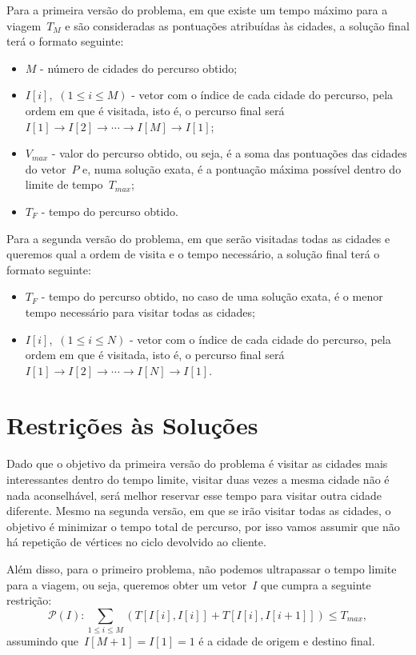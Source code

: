 \documentclass[12pt,a4paper,reqno]{report}
\numberwithin{figure}{section}
\numberwithin{equation}{section}
\numberwithin{figure}{section}
\numberwithin{equation}{section}
\begin{document}
Para a primeira versão do problema, em que existe um tempo máximo para a viagem~$T_M$ e são consideradas as pontuações atribuídas às cidades, a solução final terá o formato seguinte:
\begin{itemize}
	\item $M$ - número de cidades do percurso obtido;
	\item $I[i]$,~$(1 \leq i \leq M)$ - vetor com o índice de cada cidade do percurso, pela ordem em que é visitada, isto é, o percurso final será~$I[1] \rightarrow I[2] \rightarrow \cdots \rightarrow I[M] \rightarrow I[1]$;
	\item $V_{max}$ - valor do percurso obtido, ou seja, é a soma das pontuações das cidades do vetor~$P$ e, numa solução exata, é a pontuação máxima possível dentro do limite de tempo~$T_{max}$;
	\item $T_F$ - tempo do percurso obtido.
\end{itemize}

Para a segunda versão do problema, em que serão visitadas todas as cidades e queremos qual a ordem de visita e o tempo necessário, a solução final terá o formato seguinte:
\begin{itemize}
	\item $T_F$ - tempo do percurso obtido, no caso de uma solução exata, é o menor tempo necessário para visitar todas as cidades;
	\item $I[i]$,~$(1 \leq i \leq N)$ - vetor com o índice de cada cidade do percurso, pela ordem em que é visitada, isto é, o percurso final será~$I[1] \rightarrow I[2] \rightarrow \cdots \rightarrow I[N] \rightarrow I[1]$.
\end{itemize}

\section{Restrições às Soluções}

Dado que o objetivo da primeira versão do problema é visitar as cidades mais interessantes dentro do tempo limite, visitar duas vezes a mesma cidade não é nada aconselhável, será melhor reservar esse tempo para visitar outra cidade diferente. Mesmo na segunda versão, em que se irão visitar todas as cidades, o objetivo é minimizar o tempo total de percurso, por isso vamos assumir que não há repetição de vértices no ciclo devolvido ao cliente.

Além disso, para o primeiro problema, não podemos ultrapassar o tempo limite para a viagem, ou seja, queremos obter um vetor~$I$ que cumpra a seguinte restrição:
\begin{equation}
		\mathscr{P}(I): \sum_{1 \leq i \leq M} (T[I[i],I[i]] + T[I[i],I[i+1]]) \leq T_{max},
\end{equation}
assumindo que~$I[M+1] = I[1] = 1$ é a cidade de origem e destino final.
\end{document}
